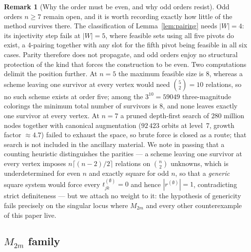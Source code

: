 \documentclass[11pt]{article}
\theoremstyle{plain}
\theoremstyle{definition}
\newtheorem{remark}[theorem]{Remark}
\begin{document}
\begin{aiblock}
\begin{remark}[Why the order must be even, and why odd orders resist]
Odd orders $n\ge7$ remain open, and it is worth recording exactly how little of the method survives
there. The classification of Lemma~\ref{lem:pairing} needs $|W|=4$: its injectivity step fails at
$|W|=5$, where feasible sets using all five pivots do exist, a $4$-pairing together with any slot for
the fifth pivot being feasible in all six cases. Parity therefore does not propagate, and odd orders
enjoy no structural protection of the kind that forces the construction to be even. Two computations
delimit the position further. At $n=5$ the maximum feasible size is $8$, whereas a scheme leaving one
survivor at every vertex would need $\binom{5}{2}=10$ relations, so no such scheme exists at order
five; among the $3^{10}=59049$ three-magnitude colorings the minimum total number of survivors is
$8$, and none leaves exactly one survivor at every vertex. At $n=7$ a pruned depth-first search of
$280$ million nodes together with canonical augmentation ($92\,423$ orbits at level~7, growth factor
$\approx4.7$) failed to exhaust the space, so brute force is closed as a route; that search is not
included in the ancillary material. We note in passing
that a counting heuristic distinguishes the parities --- a scheme leaving one survivor at every vertex
imposes $n\lceil(n-2)/2\rceil$ relations on $\binom{n}{2}$ unknowns, which is underdetermined for even
$n$ and exactly square for odd $n$, so that a \emph{generic} square system would force every
$t^{(\emptyset)}_{jk}=0$ and hence $|r^{(\emptyset)}|=1$, contradicting strict definiteness --- but we
attach no weight to it: the hypothesis of genericity fails precisely on the singular locus where
$M_{2m}$ and every other counterexample of this paper live.
\end{remark}

\subsection{$M_{2m}$ family}




\end{aiblock}
\end{document}
